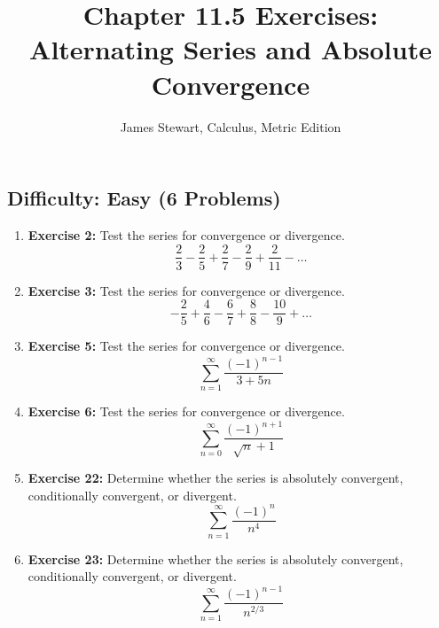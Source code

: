 \documentclass{article}
\title{Chapter 11.5 Exercises: Alternating Series and Absolute Convergence}
\author{James Stewart, Calculus, Metric Edition}
\date{}
\begin{document}
\maketitle
\hrulefill %
\vspace{1em} %

\subsection*{Difficulty: Easy (6 Problems)}
\begin{enumerate}
    \item \textbf{Exercise 2:} Test the series for convergence or divergence.
    \[ \frac{2}{3} - \frac{2}{5} + \frac{2}{7} - \frac{2}{9} + \frac{2}{11} - \dots \]
    
    \item \textbf{Exercise 3:} Test the series for convergence or divergence.
    \[ -\frac{2}{5} + \frac{4}{6} - \frac{6}{7} + \frac{8}{8} - \frac{10}{9} + \dots \]
    
    \item \textbf{Exercise 5:} Test the series for convergence or divergence.
    \[ \sum_{n=1}^{\infty} \frac{(-1)^{n-1}}{3+5n} \]
    
    \item \textbf{Exercise 6:} Test the series for convergence or divergence.
    \[ \sum_{n=0}^{\infty} \frac{(-1)^{n+1}}{\sqrt{n}+1} \]
    
    \item \textbf{Exercise 22:} Determine whether the series is absolutely convergent, conditionally convergent, or divergent.
    \[ \sum_{n=1}^{\infty} \frac{(-1)^n}{n^4} \]
    
    \item \textbf{Exercise 23:} Determine whether the series is absolutely convergent, conditionally convergent, or divergent.
    \[ \sum_{n=1}^{\infty} \frac{(-1)^{n-1}}{n^{2/3}} \]
\end{enumerate}

\hrulefill
\vspace{1em}

\end{document}

